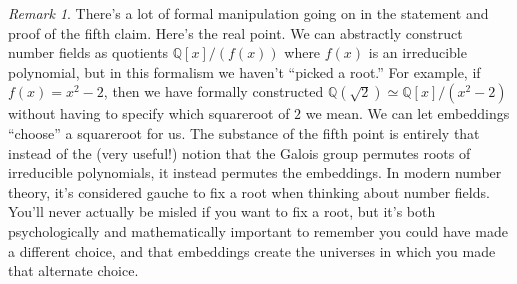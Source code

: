 \documentclass[12pt]{amsart}
\theoremstyle{definition} \newtheorem*{notation}{Notation}
\theoremstyle{remark} \newtheorem*{remark}{Remark}
\theoremstyle{remark} \newtheorem*{example}{Example}
\theoremstyle{definition} \newtheorem*{definition}{Definition}
\numberwithin{equation}{section}
\numberwithin{theorem}{section}
\begin{document}
	\begin{remark}
		There's a lot of formal manipulation going on in the statement and proof of the fifth claim.  Here's the real point.  We can abstractly construct number fields as quotients $\mathbb{Q}[x] / (f(x))$ where $f(x)$ is an irreducible polynomial, but in this formalism we haven't ``picked a root.''  For example, if $f(x)=x^2-2$, then we have formally constructed $\mathbb{Q}(\sqrt{2}) \simeq \mathbb{Q}[x]/(x^2-2)$ without having to specify which squareroot of $2$ we mean.  We can let embeddings ``choose'' a squareroot for us.  The substance of the fifth point is entirely that instead of the (very useful!) notion that the Galois group permutes roots of irreducible polynomials, it instead permutes the embeddings.  In modern number theory, it's considered gauche to fix a root when thinking about number fields.  You'll never actually be misled if you want to fix a root, but it's both psychologically and mathematically important to remember you could have made a different choice, and that embeddings create the universes in which you made that alternate choice.
	\end{remark}
\end{document}
